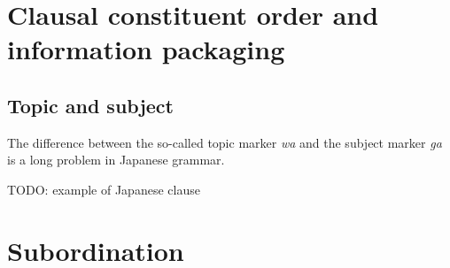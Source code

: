 \documentclass[UTF8, a4paper, oneside, scheme=plain]{ctexrep}
\newcommand{\corpus}[1]{\emph{#1}}
\begin{document}
\chapter{Clausal constituent order and information packaging}

\section{Topic and subject}\label{sec:topic-subject}

The difference between the so-called topic marker \corpus{wa} and the subject marker \corpus{ga}
is a long problem in Japanese grammar.

\begin{exe}
    \ex TODO: example of Japanese clause
\end{exe}

\chapter{Subordination}



\end{document}
